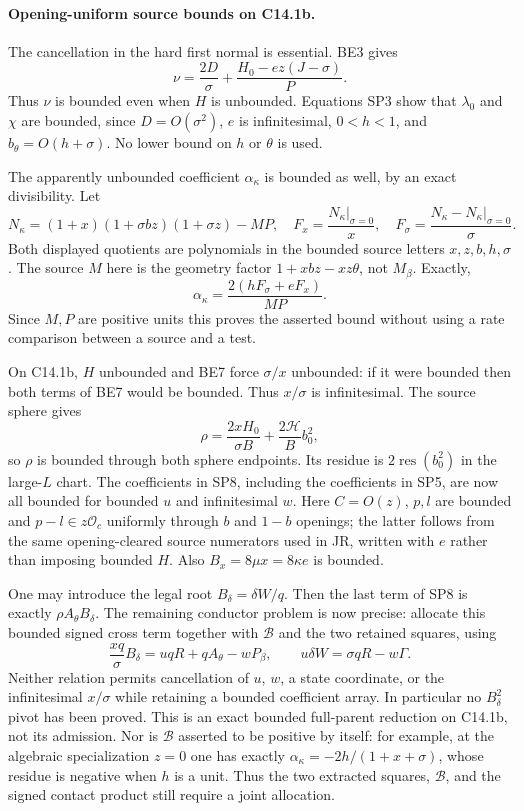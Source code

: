 \paragraph{Opening-uniform source bounds on C14.1b.}
The cancellation in the hard first normal is essential. BE3 gives
\[
 \nu=\frac{2D}{\sigma}
       +\frac{H_0-ez(J-\sigma)}{P}.
 \tag{SP9}
\]
Thus $\nu$ is bounded even when $H$ is unbounded. Equations SP3 show
that $\lambda_0$ and $\chi$ are bounded, since $D=O(\sigma^2)$,
$e$ is infinitesimal, $0<h<1$, and $b_\theta=O(h+\sigma)$.
No lower bound on $h$ or $\theta$ is used.

The apparently unbounded coefficient $\alpha_\kappa$ is bounded as
well, by an exact divisibility. Let
\[
 N_\kappa=(1+x)(1+\sigma bz)(1+\sigma z)-MP,
 \quad F_x=\frac{N_\kappa|_{\sigma=0}}x,
 \quad F_\sigma=\frac{N_\kappa-N_\kappa|_{\sigma=0}}\sigma.
\]
Both displayed quotients are polynomials in the bounded source
letters $x,z,b,h,\sigma$. The source $M$ here is the geometry factor
$1+xbz-xz\theta$, not $M_\beta$. Exactly,
\[
 \alpha_\kappa=\frac{2(hF_\sigma+eF_x)}{MP}.
 \tag{SP10}
\]
Since $M,P$ are positive units this proves the asserted bound without
using a rate comparison between a source and a test.

On C14.1b, $H$ unbounded and BE7 force $\sigma/x$ unbounded:
if it were bounded then both terms of BE7 would be bounded.
Thus $x/\sigma$ is infinitesimal. The source sphere gives
\[
 \rho=\frac{2xH_0}{\sigma B}
                  +\frac{2\mathcal H}{B}b_0^2,
 \tag{SP11}
\]
so $\rho$ is bounded through both sphere endpoints. Its residue is
$2\operatorname{res}(b_0^2)$ in the large-$L$ chart.
The coefficients in SP8, including the coefficients in SP5, are now
all bounded for bounded $u$ and infinitesimal $w$. Here
$C=O(z)$, $p,l$ are bounded and $p-l\in z\mathcal O_c$ uniformly
through $b$ and $1-b$ openings; the latter follows from the same
opening-cleared source numerators used in JR, written with $e$ rather
than imposing bounded $H$. Also $B_x=8\mu x=8\kappa e$ is bounded.

One may introduce the legal root
$B_\delta=\delta W/q$. Then the last term of SP8 is exactly
$\rho A_\theta B_\delta$. The remaining conductor problem is now
precise: allocate this bounded signed cross term together with
$\mathscr B$ and the two retained squares, using
\[
 \frac{xq}{\sigma}B_\delta
       =uqR+qA_\theta-wP_\beta,
 \qquad u\delta W=\sigma qR-w\Gamma.
 \tag{SP12}
\]
Neither relation permits cancellation of $u$, $w$, a state coordinate,
or the infinitesimal $x/\sigma$ while retaining a bounded coefficient
array. In particular no $B_\delta^2$ pivot has been proved. This is
an exact bounded full-parent reduction on C14.1b, not its admission.
Nor is $\mathscr B$ asserted to be positive by itself: for example,
at the algebraic specialization $z=0$ one has exactly
$\alpha_\kappa=-2h/(1+x+\sigma)$, whose residue is negative when
$h$ is a unit. Thus the two extracted squares, $\mathscr B$, and the
signed contact product still require a joint allocation.


